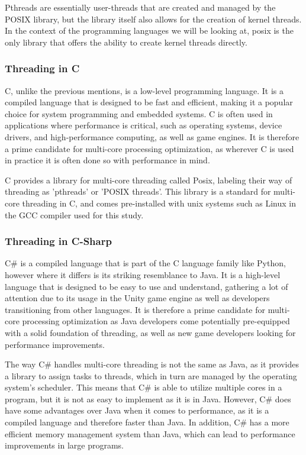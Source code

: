 \documentclass[12pt,a4paper]{article}
\begin{document}
Pthreads are essentially user-threads that are created and managed by the POSIX library, but the library itself also allows for the creation of kernel threads. In the context of the programming languages we will be looking at, posix is the only library that offers the ability to create kernel threads directly. 

\subsubsection{Threading in C}

C, unlike the previous mentions, is a low-level programming language. It is a compiled language that is designed to be fast and efficient, making it a popular choice for system programming and embedded systems. C is often used in applications where performance is critical, such as operating systems, device drivers, and high-performance computing, as well as game engines. It is therefore a prime candidate for multi-core processing optimization, as wherever C is used in practice it is often done so with performance in mind.

C provides a library for multi-core threading called Posix, labeling their way of threading as 'pthreads' or 'POSIX threads'. This library is a standard for multi-core threading in C, and comes pre-installed with unix systems such as Linux in the GCC compiler used for this study.

\subsubsection{Threading in C-Sharp}

C\# is a compiled language that is part of the C language family like Python, however where it differs is its striking resemblance to Java. It is a high-level language that is designed to be easy to use and understand, gathering a lot of attention due to its usage in the Unity game engine as well as developers transitioning from other languages. It is therefore a prime candidate for multi-core processing optimization as Java developers come potentially pre-equipped with a solid foundation of threading, as well as new game developers looking for performance improvements.

The way C\# handles multi-core threading is not the same as Java, as it provides a library to assign tasks to threads, which in turn are managed by the operating system's scheduler. This means that C\# is able to utilize multiple cores in a program, but it is not as easy to implement as it is in Java. However, C\# does have some advantages over Java when it comes to performance, as it is a compiled language and therefore faster than Java. In addition, C\# has a more efficient memory management system than Java, which can lead to performance improvements in large programs.
\end{document}

